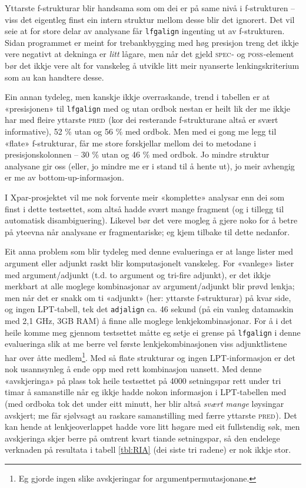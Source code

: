 \documentclass[12pt,a4paper,oneside,draft]{report}
\newcommand{\F}[2]{\textsc{#1}\ensuremath{_{#2}}}
\newcommand{\SPEC}{\F{spec}{}}
\newcommand{\POSS}{\F{poss}{}}
\newcommand{\PRED}{\F{pred}{}}
\begin{document}
Yttarste f\hyp{}strukturar blir handsama som om dei er på same nivå i
 f\hyp{}strukturen -- viss det eigentleg finst ein intern struktur mellom
 desse blir det ignorert. Det vil seie at for store delar av analysane
 får \texttt{lfgalign} ingenting ut av f\hyp{}strukturen.  Sidan programmet er
 meint for trebankbygging med høg presisjon treng det ikkje vere
 negativt at dekninga er \emph{litt} lågare, men når det gjeld \SPEC{}- og
 \POSS{}-element bør det ikkje vere alt for vanskeleg å utvikle litt
 meir nyanserte lenkingskriterium som au kan handtere desse. 

Ein annan tydeleg, men kanskje ikkje overraskande, trend i tabellen er
 at «presisjonen» til \texttt{lfgalign} med og utan ordbok nestan er heilt
 lik der me ikkje har med fleire yttarste \PRED{} (kor dei resterande
 f\hyp{}strukturane altså er svært informative), 52 \% utan og 56 \% med
 ordbok. Men med ei gong me legg til «flate» f\hyp{}strukturar, får me
 store forskjellar mellom dei to metodane i presisjonskolonnen -- 30 \%
 utan og 46 \% med ordbok. Jo mindre struktur analysane gir oss (eller,
 jo mindre me er i stand til å hente ut), jo meir avhengig er me av
 bottom-up-informasjon.

I Xpar-prosjektet vil me nok forvente meir «komplette» analysar enn
 dei som finst i dette testsettet, som altså hadde svært mange
 fragment (og i tillegg til automatisk disambiguering). Likevel bør
 det vere mogleg å gjere noko for å betre på yteevna når analysane er
 fragmentariske; eg kjem tilbake til dette nedanfor.

Eit anna problem som blir tydeleg med denne evalueringa er at lange
 lister med argument eller adjunkt raskt blir komputasjonelt vanskeleg. For
 «vanlege» lister med argument/adjunkt (t.d. to argument og tri-fire
 adjunkt), er det ikkje merkbart at alle moglege kombinasjonar av
 argument/adjunkt blir prøvd lenkja; men når det er snakk om ti
 «adjunkt» (her: yttarste f\hyp{}strukturar) på kvar side, og ingen
 LPT-tabell, tek det \texttt{adjalign} ca. 46 sekund (på ein vanleg
 datamaskin med 2,1 GHz, 3GB RAM) å finne alle moglege
 lenkjekombinasjonar. For å i det heile komme meg gjennom testsettet
 måtte eg setje ei grense på \texttt{lfgalign} i denne evalueringa slik at me
 berre vel første lenkjekombinasjonen viss adjunktlistene har over
 åtte medlem\footnote{Eg gjorde ingen slike avskjeringar for argumentpermutasjonane. }. Med så flate strukturar og ingen LPT\hyp{}informasjon
 er det nok usannsynleg å ende opp med rett kombinasjon uansett. Med
 denne «avskjeringa» på plass tok heile testsettet på 4000 setningspar
 rett under tri timar å samanstille når eg ikkje hadde nokon
 informasjon i LPT-tabellen med (med ordboka tok det under eitt
 minutt, her blir altså \emph{svært mange} løysingar avskjert; me får
 sjølvsagt au raskare samanstilling med færre yttarste \PRED{}). Det
 kan hende at lenkjeoverlappet hadde vore litt høgare med eit
 fullstendig søk, men avskjeringa skjer berre på omtrent kvart tiande
 setningspar, så den endelege verknaden på resultata i tabell
 \ref{tbl:RIA} (dei siste tri radene) er nok ikkje stor.
\end{document}
